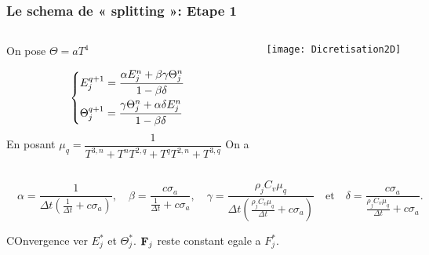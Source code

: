 \begin{frame}
  \frametitle{Le schema de « splitting »: Etape 1}
  \begin{columns}
    \begin{column}{0.5\textwidth}
      On pose $\Theta = aT^4$

      \begingroup
      \normalsize
      \begin{equation*} 
        \begin{dcases}
         E_j^{q+1} = \dfrac{\alpha E_j^n + \beta \gamma \Theta_j^n}{1 - \beta \delta} \\
         \Theta_j^{q+1} = \dfrac{\gamma \Theta_j^n + \alpha \delta E_j^n}{1 - \beta \delta} 
        \end{dcases}
    \label{eqn:Step1}
    \end{equation*}
      \endgroup
      En posant
      \scriptsize
      $\mu_q = \dfrac{1}{T^{3,n} + T^{n}T^{2,q} + T^{q}T^{2,n} + T^{3,q}}$
      \normalsize
      On a
    \end{column}
    \begin{column}{0.5\textwidth}
       \begin{center}
        \texttt{[image: Dicretisation2D]}       
       \end{center}
    \end{column}
   \end{columns}
   \tiny
  $\quad  \alpha = \dfrac{1}{\Delta t \left( \frac{1}{\Delta t} + c \sigma_a \right)} ,\quad 
   \beta = \dfrac{c \sigma_a}{\frac{1}{\Delta t} + c \sigma_a} ,\quad 
   \gamma = \dfrac{\rho_j C_v \mu_q}{\Delta t \left( \frac{\rho_j C_v \mu_q}{\Delta t} + c \sigma_a \right)} \quad \text{et} \quad  
   \delta = \dfrac{c \sigma_a}{\frac{\rho_j C_v \mu_q}{\Delta t} + c \sigma_a}.$

   \normalsize
   COnvergence ver $E_j^*$ et $\Theta_j^*$. $\mathbf{F}_j$ reste constant egale a $F_j^*$.
   
\end{frame}


